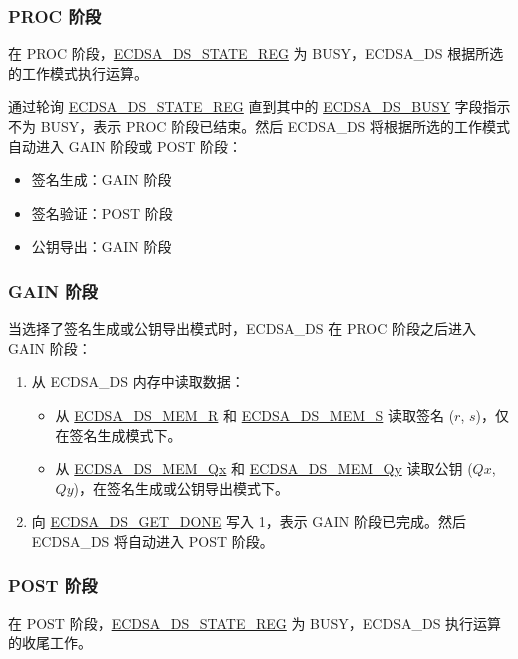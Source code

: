 \documentclass[main\_\_CN.tex]{subfiles}
\begin{document}
\subsubsection{PROC 阶段}

在 PROC 阶段，\hyperref[regdesc:ECDSADSSTATEREG]{ECDSA\_DS\_STATE\_REG} 为 BUSY，ECDSA\_DS 根据所选的工作模式执行运算。

通过轮询 \hyperref[regdesc:ECDSADSSTATEREG]{ECDSA\_DS\_STATE\_REG} 直到其中的 \hyperref[fielddesc:ECDSADSBUSY]{ECDSA\_DS\_BUSY} 字段指示不为 BUSY，表示 PROC 阶段已结束。然后 ECDSA\_DS 将根据所选的工作模式自动进入 GAIN 阶段或 POST 阶段：
\begin{itemize}
    \item 签名生成：GAIN 阶段
    \item 签名验证：POST 阶段
    \item 公钥导出：GAIN 阶段
\end{itemize}

\subsubsection{GAIN 阶段}

当选择了签名生成或公钥导出模式时，ECDSA\_DS 在 PROC 阶段之后进入 GAIN 阶段：

\begin{enumerate}
	\item 从 ECDSA\_DS 内存中读取数据：
	      \begin{itemize}
		      \item 从 \hyperref[tab:ecdsa-memory]{ECDSA\_DS\_MEM\_R} 和 \hyperref[tab:ecdsa-memory]{ECDSA\_DS\_MEM\_S} 读取签名 ($r$, $s$)，仅在签名生成模式下。
		      \item 从 \hyperref[tab:ecdsa-memory]{ECDSA\_DS\_MEM\_Qx} 和 \hyperref[tab:ecdsa-memory]{ECDSA\_DS\_MEM\_Qy} 读取公钥 ($Qx$, $Qy$)，在签名生成或公钥导出模式下。
	      \end{itemize}
	\item 向 \hyperref[fielddesc:ECDSADSGETDONE]{ECDSA\_DS\_GET\_DONE} 写入 1，表示 GAIN 阶段已完成。然后 ECDSA\_DS 将自动进入 POST 阶段。
\end{enumerate}

\subsubsection{POST 阶段}

在 POST 阶段，\hyperref[regdesc:ECDSADSSTATEREG]{ECDSA\_DS\_STATE\_REG} 为 BUSY，ECDSA\_DS 执行运算的收尾工作。
\end{document}
